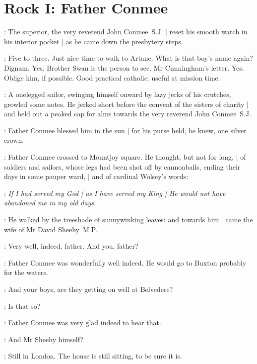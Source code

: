 \section*{Rock I: Father Conmee}

:
The superior, the very reverend John Conmee~S.J. |
reset his smooth watch in his interior pocket |
as he came down the presbytery steps.

\conmeeint:
Five to three.
Just nice time to walk to Artane.
What is that boy's name again?
Dignam.
Yes.
Brother Swan is the person to see.
Mr Cunningham's letter.
Yes.
Oblige him, if possible.
Good practical catholic:
useful at mission time.


:
A onelegged sailor,
swinging himself onward by lazy jerks of his crutches,
growled some notes.
He jerked short before the convent of the sisters of charity |
and held out a peaked cap for alms
towards the very reverend John Conmee~S.J.

:
Father Conmee blessed him in the sun |
for his purse held,
he knew,
one silver crown.


:
Father Conmee crossed to Mountjoy square.
He thought,
but not for long, |
of soldiers and sailors,
whose legs had been shot off by cannonballs,
ending their days in some pauper ward, |
and of cardinal Wolsey's words:

\conmeeint:
\emph{If I had served my God |
as I have served my King |
He would not have abandoned me in my old days.}

:
He walked by the treeshade of sunnywinking leaves:
and towards him |
came the wife of Mr David Sheehy~M.P.


\mrssheehy:
Very well, indeed, father.
And you, father?

:
Father Conmee was wonderfully well indeed.
He would go to Buxton probably for the waters.

\conmee:
And your boys, are they getting on well at Belvedere?

\conmee:
Is that so?

:
Father Conmee was very glad indeed to hear that.

\conmee:
And Mr Sheehy himself?

\mrssheehy:
Still in London.
The house is still sitting, to be sure it is.

